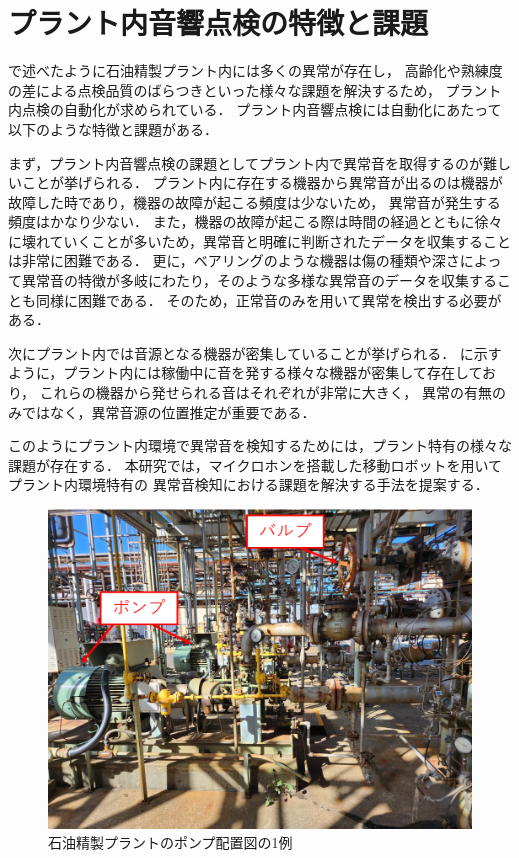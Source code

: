 \documentclass[../main]{subfiles}
\begin{document}
\section{プラント内音響点検の特徴と課題}
\label{sec:intro_anomaly-detection}
で述べたように石油精製プラント内には多くの異常が存在し，
高齢化や熟練度の差による点検品質のばらつきといった様々な課題を解決するため，
プラント内点検の自動化が求められている．
プラント内音響点検には自動化にあたって以下のような特徴と課題がある．


まず，プラント内音響点検の課題としてプラント内で異常音を取得するのが難しいことが挙げられる．
プラント内に存在する機器から異常音が出るのは機器が故障した時であり，機器の故障が起こる頻度は少ないため，
異常音が発生する頻度はかなり少ない．
また，機器の故障が起こる際は時間の経過とともに徐々に壊れていくことが多いため，異常音と明確に判断されたデータを収集することは非常に困難である．
更に，ベアリングのような機器は傷の種類や深さによって異常音の特徴が多岐にわたり，そのような多様な異常音のデータを収集することも同様に困難である．
そのため，正常音のみを用いて異常を検出する必要がある．

次にプラント内では音源となる機器が密集していることが挙げられる．
に示すように，プラント内には稼働中に音を発する様々な機器が密集して存在しており，
これらの機器から発せられる音はそれぞれが非常に大きく，
異常の有無のみではなく，異常音源の位置推定が重要である．

このようにプラント内環境で異常音を検知するためには，プラント特有の様々な課題が存在する．
本研究では，マイクロホンを搭載した移動ロボットを用いてプラント内環境特有の
異常音検知における課題を解決する手法を提案する．

\begin{figure}[t]
  \centering
  \includegraphics[keepaspectratio, width=0.7\linewidth]{chap1/pump_location.png}
  \caption{石油精製プラントのポンプ配置図の1例}
  \label{fig:pump_location}
\end{figure}
\end{document}

